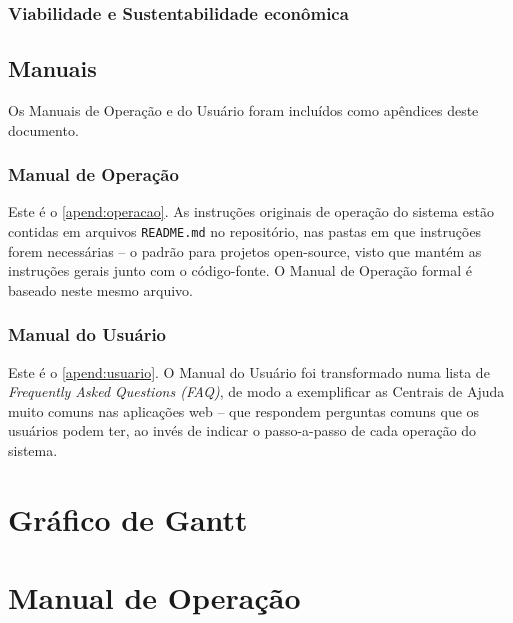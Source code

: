 \documentclass[12pt,a4paper,twoside,hyphens,english,brazil]{abntex2}
\begin{document}
{\subsection{Viabilidade e Sustentabilidade econômica}


\section{Manuais}
Os Manuais de Operação e do Usuário foram incluídos como apêndices deste documento.

\subsection{Manual de Operação}
Este é o \autoref{apend:operacao}. As instruções originais de operação do sistema estão contidas em arquivos \texttt{README.md} no repositório, nas pastas em que instruções forem necessárias -- o padrão para projetos open-source, visto que mantém as instruções gerais junto com o código-fonte. O Manual de Operação formal é baseado neste mesmo arquivo.

\subsection{Manual do Usuário}
Este é o \autoref{apend:usuario}. O Manual do Usuário foi transformado numa lista de \emph{Frequently Asked Questions (FAQ)}, de modo a exemplificar as Centrais de Ajuda muito comuns nas aplicações web -- que respondem perguntas comuns que os usuários podem ter, ao invés de indicar o passo-a-passo de cada operação do sistema.

\postextual

\apendices

\chapter{Gráfico de Gantt} \label{apend:gantt}

	
\chapter{Manual de Operação} \label{apend:operacao}

}
\end{document}
